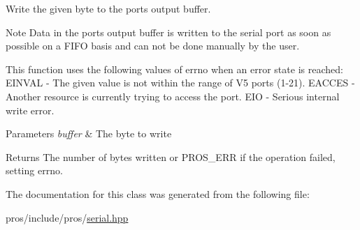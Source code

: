 Write the given byte to the port\textquotesingle{}s output buffer. 

\begin{DoxyNote}{Note}
Data in the port\textquotesingle{}s output buffer is written to the serial port as soon as possible on a F\+I\+FO basis and can not be done manually by the user.
\end{DoxyNote}
This function uses the following values of errno when an error state is reached\+: E\+I\+N\+V\+AL -\/ The given value is not within the range of V5 ports (1-\/21). E\+A\+C\+C\+ES -\/ Another resource is currently trying to access the port. E\+IO -\/ Serious internal write error.


\begin{DoxyParams}{Parameters}
{\em buffer} & The byte to write\\
\hline
\end{DoxyParams}
\begin{DoxyReturn}{Returns}
The number of bytes written or P\+R\+O\+S\+\_\+\+E\+RR if the operation failed, setting errno. 
\end{DoxyReturn}


The documentation for this class was generated from the following file\+:\begin{DoxyCompactItemize}
\item 
pros/include/pros/\hyperlink{serial_8hpp}{serial.\+hpp}\end{DoxyCompactItemize}
